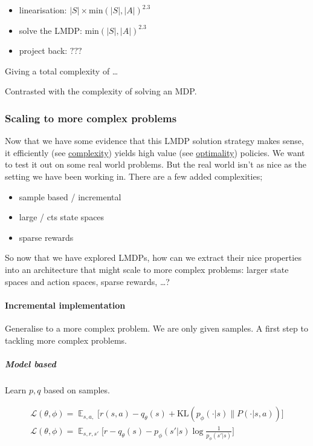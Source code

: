 \begin{itemize}
\tightlist
\item
  linearisation: \(|S| \times \text{min}(|S|,|A|)^{2.3}\)
\item
  solve the LMDP: \(\text{min}(|S|,|A|)^{2.3}\)
\item
  project back: \(???\)
\end{itemize}

Giving a total complexity of \ldots{}

Contrasted with the complexity of solving an MDP.

\hypertarget{scaling-to-more-complex-problems}{%
\subsubsection{Scaling to more complex
problems}\label{scaling-to-more-complex-problems}}

Now that we have some evidence that this LMDP solution strategy makes
sense, it efficiently (see \href{}{complexity}) yields high value (see
\href{}{optimality}) policies. We want to test it out on some real world
problems. But the real world isn't as nice as the setting we have been
working in. There are a few added complexities;

\begin{itemize}
\tightlist
\item
  sample based / incremental
\item
  large / cts state spaces
\item
  sparse rewards
\end{itemize}

So now that we have explored LMDPs, how can we extract their nice
properties into an architecture that might scale to more complex
problems: larger state spaces and action spaces, sparse rewards,
\ldots{}?

\hypertarget{incremental-implementation}{%
\paragraph{Incremental
implementation}\label{incremental-implementation}}

Generalise to a more complex problem. We are only given samples. A first
step to tackling more complex problems.

\hypertarget{model-based}{%
\subparagraph{Model based}\label{model-based}}

Learn \(p, q\) based on samples.

\begin{align}
\mathcal L(\theta, \phi) = \mathop{\mathbb E}_{s, a,} \bigg[ r(s, a) - q_\theta(s) + \text{KL}(p_\phi(\cdot | s) \parallel P(\cdot | s, a)) \bigg]\\
\mathcal L(\theta, \phi) = \mathop{\mathbb E}_{s, r, s'} \bigg[r - q_\theta(s) - p_\phi(s' | s) \log \frac{1}{ p_\phi(s' | s)} \bigg] \\
\end{align}


